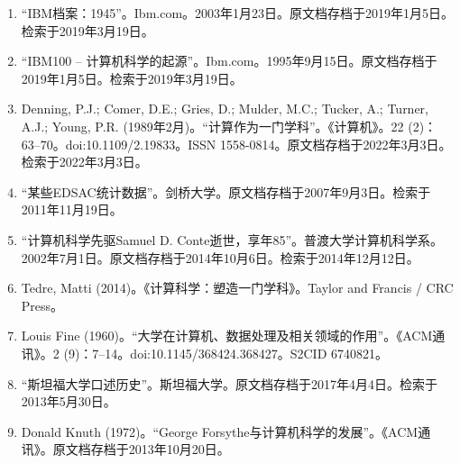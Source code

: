 \begin{enumerate}
\item “IBM档案：1945”。Ibm.com。2003年1月23日。原文档存档于2019年1月5日。检索于2019年3月19日。  
\item “IBM100 – 计算机科学的起源”。Ibm.com。1995年9月15日。原文档存档于2019年1月5日。检索于2019年3月19日。  
\item Denning, P.J.; Comer, D.E.; Gries, D.; Mulder, M.C.; Tucker, A.; Turner, A.J.; Young, P.R. (1989年2月)。“计算作为一门学科”。《计算机》。22 (2)：63–70。doi:10.1109/2.19833。ISSN 1558-0814。原文档存档于2022年3月3日。检索于2022年3月3日。  
\item “某些EDSAC统计数据”。剑桥大学。原文档存档于2007年9月3日。检索于2011年11月19日。  
\item “计算机科学先驱Samuel D. Conte逝世，享年85”。普渡大学计算机科学系。2002年7月1日。原文档存档于2014年10月6日。检索于2014年12月12日。  
\item Tedre, Matti (2014)。《计算科学：塑造一门学科》。Taylor and Francis / CRC Press。  
\item Louis Fine (1960)。“大学在计算机、数据处理及相关领域的作用”。《ACM通讯》。2 (9)：7–14。doi:10.1145/368424.368427。S2CID 6740821。  
\item “斯坦福大学口述历史”。斯坦福大学。原文档存档于2017年4月4日。检索于2013年5月30日。  
\item Donald Knuth (1972)。“George Forsythe与计算机科学的发展”。《ACM通讯》。原文档存档于2013年10月20日。


\end{enumerate}
